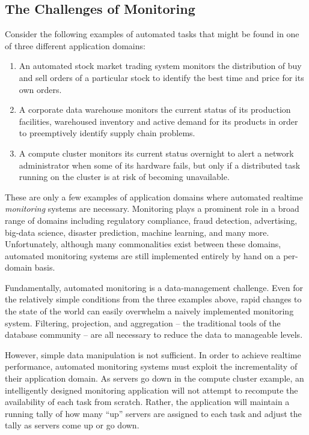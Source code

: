 \subsection{The Challenges of Monitoring}
Consider the following examples of automated tasks that might be found in one of three different application domains:
\begin{enumerate}
\item An automated stock market trading system monitors the distribution of buy and sell orders of a particular stock to identify the best time and price for its own orders.
\item A corporate data warehouse monitors the current status of its production facilities, warehoused inventory and active demand for its products in order to preemptively identify supply chain problems.
\item A compute cluster monitors its current status overnight to alert a network administrator when some of its hardware fails, but only if a distributed task running on the cluster is at risk of becoming unavailable.
\end{enumerate}

These are only a few examples of application domains where automated realtime {\em monitoring} systems are necessary.  Monitoring plays a prominent role in a broad range of domains including regulatory compliance\cite{basel2}, fraud detection\cite{ibmfico}, advertising\cite{agarwal2010forecasting}, big-data science\cite{hey2009fourth}, disaster prediction\cite{scholz1973earthquake}, machine learning\cite{olesen2008real}, and many more.  Unfortunately, although many commonalities exist between these domains, automated monitoring systems are still implemented entirely by hand on a per-domain basis.

Fundamentally, automated monitoring is a data-management challenge.  Even for the relatively simple conditions from the three examples above, rapid changes to the state of the world can easily overwhelm a naively implemented monitoring system.  Filtering, projection, and aggregation -- the traditional tools of the database community -- are all necessary to reduce the data to manageable levels.  

However, simple data manipulation is not sufficient.  In order to achieve realtime performance, automated monitoring systems must exploit the incrementality of their application domain.  As servers go down in the compute cluster example, an intelligently designed monitoring application will not attempt to recompute the availability of each task from scratch.  Rather, the application will maintain a running tally of how many ``up'' servers are assigned to each task and adjust the tally as servers come up or go down.  

